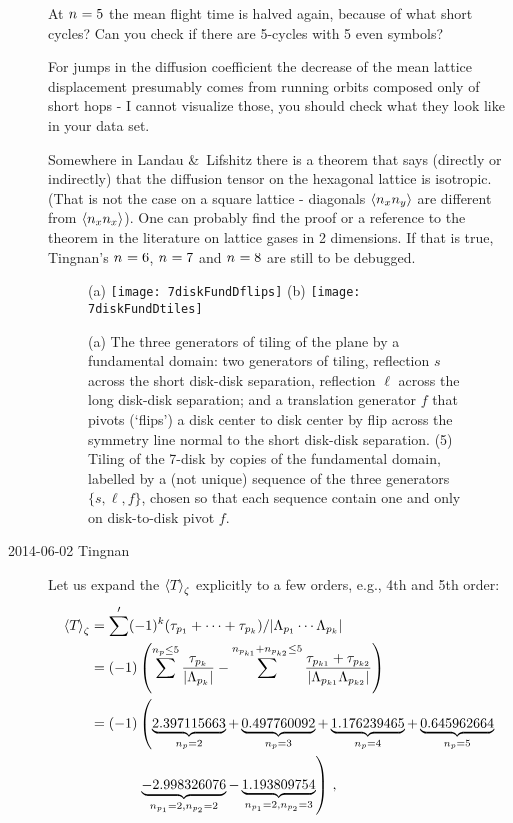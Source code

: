 \begin{description}
At ${n_{}}=5$  the mean flight time is halved again, because of
what short cycles? Can you check if there are 5-cycles with 5 even symbols?

For jumps in the diffusion coefficient the decrease of the mean
lattice displacement presumably comes from running orbits composed
only of short hops - I cannot visualize those, you should check what they look
like in your data set.

Somewhere in Landau \&\ Lifshitz there is a theorem that says (directly
or indirectly) that the diffusion tensor on the hexagonal lattice is
isotropic. (That is not the case on a square lattice - diagonals
$\left\langle {n_{x}n_{y}} \right\rangle$ are different from $\left\langle {n_{x}n_{x}} \right\rangle$).
One can probably find the proof or a reference to the theorem in the
literature on lattice gases in 2 dimensions. If that is true, Tingnan's
${n_{}}=6$, ${n_{}}=7$ and ${n_{}}=8$ are still to be debugged.

\begin{figure}
\begin{center}
(a) \texttt{[image: 7diskFundDflips]}
(b) \texttt{[image: 7diskFundDtiles]}
\end{center}
\caption{
(a) The three generators of tiling of the plane by a fundamental domain:
two generators of  tiling, reflection $s$ across the short
disk-disk separation, reflection  $\ell$  across the long disk-disk
separation;
and
a translation generator $f$ that pivots (`flips') a disk center to disk
center by flip across the symmetry line normal to the short disk-disk
separation.
(5) Tiling of the 7-disk by copies of the fundamental domain, labelled
by a (not unique) sequence of the three generators
$\{s,\ell,f\}$, chosen so that each sequence contain one and only on
    disk-to-disk pivot $f$.
        }
\label{7diskFundDflips}
\end{figure}

\item[2014-06-02 Tingnan]
Let us expand the $\left\langle {{\ensuremath{T_{}}}} \right\rangle_\zeta$ explicitly to a few
orders, e.g., 4th and 5th order:
\begin{align*}
\spaceAver{\period{}}_\zeta
  &=\sum^{\prime}(-1)^{k}(\tau_{p_1}+\cdots+\tau_{p_k})/\vert\ExpaEig_{p_1}\cdots\ExpaEig_{p_k}\vert\\
  &=(-1)\left(\sum^{n_p\leq5}\frac{\tau_{p_k}}{\vert\ExpaEig_{p_k}\vert} - \sum^{n_{p_{k1}}+n_{p_{k2}}\leq5}\frac{\tau_{p_{k1}}+\tau_{p_{k2}}}{\vert\ExpaEig_{p_{k1}}\ExpaEig_{p_{k2}}\vert} \right)\\
  &=(-1)\left(\underbrace{2.397115663}_{n_p=2} + \underbrace{0.497760092}_{n_p=3} + \underbrace{1.176239465}_{n_p=4} + \underbrace{0.645962664}_{n_p=5}\right.\\
  &\phantom{{}=(-1)}\left.\underbrace{-2.998326076}_{n_{p_1}=2,n_{p_2}=2} - \underbrace{1.193809754}_{n_{p_1}=2,n_{p_2}=3}\right)
\,,
\end{align*}


\end{description}
